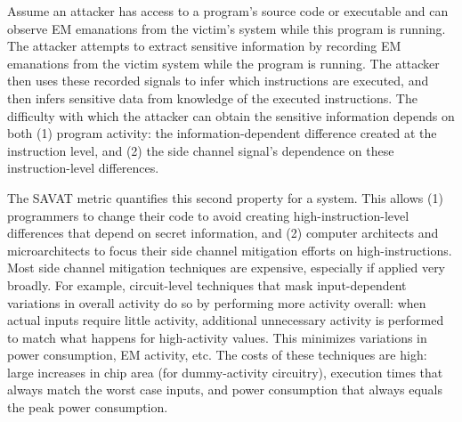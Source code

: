 Assume an attacker has access to a program's source code or executable and can observe EM emanations from the victim's system while this program is running. The attacker attempts to extract sensitive information by recording EM emanations from the victim system while the program is running. The attacker then uses these recorded signals to infer which instructions are executed, and then infers sensitive data from knowledge of the executed instructions. The difficulty with which the attacker can obtain the sensitive information depends on both (1) program activity: the information-dependent difference created at the instruction level, and (2) the side channel signal's dependence on these instruction-level differences. 

The SAVAT metric quantifies this second property for a system. This allows (1) programmers to change their code to avoid creating high-\SAVAT instruction-level differences that depend on secret information, and (2) computer architects and microarchitects to focus their side channel mitigation efforts on high-\SAVAT instructions. Most side channel mitigation techniques are expensive, especially if applied very broadly. For example, circuit-level techniques that mask input-dependent variations in overall activity do so by performing more activity overall: when actual inputs require little activity, additional unnecessary activity is performed to match what happens for high-activity values. This minimizes variations in power consumption, EM activity, etc. The costs of these techniques are high: large increases in chip area (for dummy-activity circuitry), execution times that always match the worst case inputs, and power consumption that always equals the peak power consumption.

